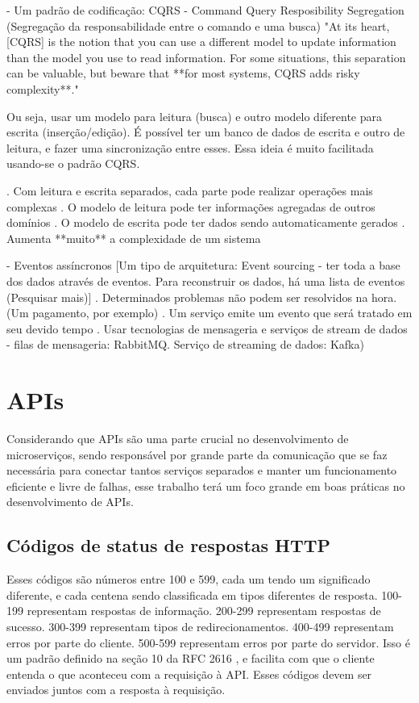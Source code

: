         - Um padrão de codificação: CQRS - Command Query Resposibility Segregation (Segregação da responsabilidade entre o comando e uma busca)
            "At its heart, [CQRS] is the notion that you can use a different model to update information than the model you use to read information. For some situations, this separation can be valuable, but beware that **for most systems, CQRS adds risky complexity**."

           Ou seja, usar um modelo para leitura (busca) e outro modelo diferente para escrita (inserção/edição). É possível ter um banco de dados de escrita e outro de leitura, e fazer uma sincronização entre esses. Essa ideia é muito facilitada usando-se o padrão CQRS.
           
           . Com leitura e escrita separados, cada parte pode realizar operações mais complexas
           . O modelo de leitura pode ter informações agregadas de outros domínios
           . O modelo de escrita pode ter dados sendo automaticamente gerados
           . Aumenta **muito** a complexidade de um sistema

        - Eventos assíncronos
            [Um tipo de arquitetura: Event sourcing - ter toda a base dos dados através de eventos. Para reconstruir os dados, há uma lista de eventos (Pesquisar mais)]
            . Determinados problemas não podem ser resolvidos na hora. (Um pagamento, por exemplo)
            . Um serviço emite um evento que será tratado em seu devido tempo
            . Usar tecnologias de mensageria e serviços de stream de dados - filas de mensageria: RabbitMQ. Serviço de streaming de dados: Kafka)

\section{APIs}\label{boas-praticas-apis}

Considerando que APIs são uma parte crucial no desenvolvimento de microserviços, sendo responsável por grande parte da comunicação que se faz necessária para conectar tantos serviços separados e manter um funcionamento eficiente e livre de falhas, esse trabalho terá um foco grande em boas práticas no desenvolvimento de APIs.

\subsection{Códigos de status de respostas HTTP}
Esses códigos são números entre 100 e 599, cada um tendo um significado diferente, e cada centena sendo classificada em tipos diferentes de resposta. 100-199 representam respostas de informação. 200-299 representam respostas de sucesso. 300-399 representam tipos de redirecionamentos. 400-499 representam erros por parte do cliente. 500-599 representam erros por parte do servidor. Isso é um padrão definido na seção 10 da RFC 2616 \cite{rfc_http_nielsen_1999}, e facilita com que o cliente entenda o que aconteceu com a requisição à API. Esses códigos devem ser enviados juntos com a resposta à requisição.


